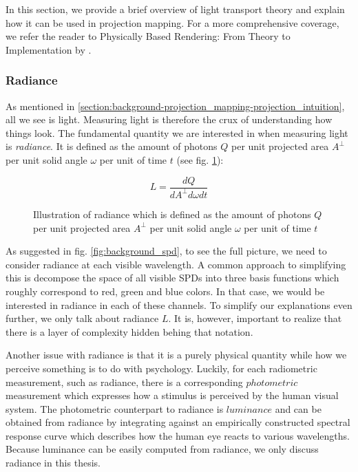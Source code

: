 In this section, we provide a brief overview of light transport theory and explain how it can be used in projection mapping. For a more comprehensive coverage, we refer the reader to Physically Based Rendering: From Theory to Implementation by \citet{PBRT3e}.

\subsubsection{Radiance}
\label{section:background-projection_mapping-light_transport-radiance}

As mentioned in \ref{section:background-projection_mapping-projection_intuition}, all we see is light. Measuring light is therefore the crux of understanding how things look. The fundamental quantity we are interested in when measuring light is \textit{radiance}. It is defined as the amount of photons \(Q\) per unit projected area \(A^\perp \) per unit solid angle \(\omega\) per unit of time \(t\) (see fig. \ref{fig:background_radiance}):

\begin{equation}
    \label{eq:radiance}
    L = \frac{dQ}{dA^\perp d\omega dt}
\end{equation}

\begin{figure}[ht]
    \centering
    \def\svgwidth{0.8\textwidth}
    
    \caption{Illustration of radiance which is defined as the amount of photons \(Q\) per unit projected area \(A^\perp \) per unit solid angle \(\omega\) per unit of time \(t\)}
    \label{fig:background_radiance}
\end{figure}

As suggested in fig. \ref{fig:background_spd}, to see the full picture, we need to consider radiance at each visible wavelength. A common approach to simplifying this is decompose the space of all visible SPDs into three basis functions which roughly correspond to red, green and blue colors. In that case, we would be interested in radiance in each of these channels. To simplify our explanations even further, we only talk about radiance \(L\). It is, however, important to realize that there is a layer of complexity hidden behing that notation.

Another issue with radiance is that it is a purely physical quantity while how we perceive something is to do with psychology. Luckily, for each radiometric measurement, such as radiance, there is a corresponding \(photometric\) measurement which expresses how a stimulus is perceived by the human visual system. The photometric counterpart to radiance is \(luminance\) and can be obtained from radiance by integrating against an empirically constructed spectral response curve which describes how the human eye reacts to various wavelengths. Because luminance can be easily computed from radiance, we only discuss radiance in this thesis.

